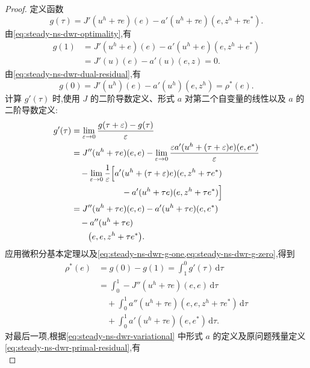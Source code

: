 \begin{proof}
定义函数
\[
  g(\tau)=J'(u^h+\tau e)(e)
         -a'(u^h+\tau e)(e,z^h+\tau e^*).
\]
由\cref{eq:steady-ns-dwr-optimality},有
\begin{equation}\label{eq:steady-ns-dwr-g-one}
\begin{aligned}
  g(1)
   &=J'(u^h+e)(e)-a'(u^h+e)(e,z^h+e^*)\\
   &=J'(u)(e)-a'(u)(e,z)=0.
\end{aligned}
\end{equation}
由\cref{eq:steady-ns-dwr-dual-residual},有
\begin{equation}\label{eq:steady-ns-dwr-g-zero}
  g(0)=J'(u^h)(e)-a'(u^h)(e,z^h)=\rho^*(e).
\end{equation}
计算 $g'(\tau)$ 时,使用 $J$ 的二阶导数定义、形式 $a$ 对第二个自变量的线性以及 $a$ 的二阶导数定义:
\[
\begin{aligned}
  g'(\tau)
   &=\lim_{\varepsilon\to0}
       \frac{g(\tau+\varepsilon)-g(\tau)}{\varepsilon}\\
   &=J''(u^h+\tau e)(e,e)
      -\lim_{\varepsilon\to0}
        \frac{\varepsilon a'(u^h+(\tau+\varepsilon)e)(e,e^*)}{\varepsilon}\\
   &\quad-\lim_{\varepsilon\to0}\frac{1}{\varepsilon}\Bigl[
       a'(u^h+(\tau+\varepsilon)e)(e,z^h+\tau e^*)\\
   &\qquad\qquad\qquad-a'(u^h+\tau e)(e,z^h+\tau e^*)\Bigr]\\
   &=J''(u^h+\tau e)(e,e)
      -a'(u^h+\tau e)(e,e^*)\\
   &\quad-a''(u^h+\tau e)\\
   &\qquad\bigl(e,e,z^h+\tau e^*\bigr).
\end{aligned}
\]
应用微积分基本定理以及\cref{eq:steady-ns-dwr-g-one,eq:steady-ns-dwr-g-zero},得到
\begin{equation}\label{eq:steady-ns-dwr-residual-integral}
\begin{aligned}
  \rho^*(e)
   &=g(0)-g(1)=\int_1^0 g'(\tau)\,\mathrm{d}\tau\\
   &=\int_0^1-J''(u^h+\tau e)(e,e)\,\mathrm{d}\tau\\
   &\quad+\int_0^1a''(u^h+\tau e)(e,e,z^h+\tau e^*)\,\mathrm{d}\tau\\
   &\quad+\int_0^1a'(u^h+\tau e)(e,e^*)\,\mathrm{d}\tau.
\end{aligned}
\end{equation}
对最后一项,根据\cref{eq:steady-ns-dwr-variational} 中形式 $a$ 的定义及原问题残量定义\cref{eq:steady-ns-dwr-primal-residual},有
\begin{equation}\label{eq:steady-ns-dwr-primal-residual-e}

\end{equation}
\end{proof}
